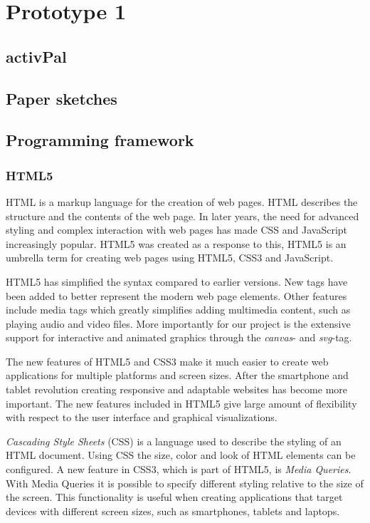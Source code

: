 \chapter{Prototype 1}

\section{activPal}

\section{Paper sketches}

\section{Programming framework}
\subsection{HTML5}
HTML is a markup language for the creation of web pages. HTML describes the structure and the contents of the web page. In later years, the need for advanced styling and complex interaction with web pages has made CSS and JavaScript increasingly popular. HTML5 was created as a response to this, HTML5 is an umbrella term for creating web pages using HTML5, CSS3 and JavaScript.

HTML5 has simplified the syntax compared to earlier versions. New tags have been added to better represent the modern web page elements. Other features include media tags which greatly simplifies adding multimedia content, such as playing audio and video files. More importantly for our project is the extensive support for interactive and animated graphics through the \emph{canvas}- and \emph{svg}-tag.

The new features of HTML5 and CSS3 make it much easier to create web applications for multiple platforms and screen sizes. After the smartphone and tablet revolution creating responsive and adaptable websites has become more important. The new features included in HTML5 give large amount of flexibility with respect to the user interface and graphical visualizations.

\emph{Cascading Style Sheets} (CSS) is a language used to describe the styling of an HTML document. Using CSS the size, color and look of HTML elements can be configured. A new feature in CSS3, which is part of HTML5, is \emph{Media Queries}. With Media Queries it is possible to specify different styling relative to the size of the screen. This functionality is useful when creating applications that target devices with different screen sizes, such as smartphones, tablets and laptops. 

